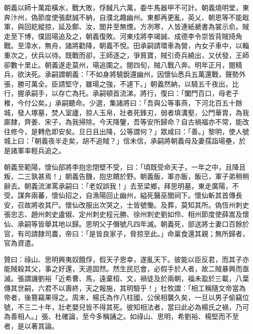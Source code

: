 \begin{pinyinscope}
 朝義以師十萬距橫水，戰大敗，俘馘凡六萬，委牛馬器甲不可計。朝義燒明堂，東奔汴州，偽節度使張獻誠不納，自濮北趣幽州。東都再更亂，英乂、朝恩等不能戢軍，與回紇縱掠，延及鄭、汝，閭井至無煙。方冽寒，人皆連紙褫書為裳示俞。賊走至下博，僕固瑒追及之，朝義復敗。河東戍將李竭誠、成德李令崇皆背賊掎角戰。至漳水，無舟，諸將勸降，朝義不悅。田承嗣請環車為營，內女子車中，以輜重次之，伏兵以待。既戰而卻，王師逐之，爭貲寶，賊引奇兵繞出，又伏發，王師卻數十里止。朝義遂走莫州，瑒追圍之。閱四旬，賊八戰八奔。明年正月，閱精兵，欲決死。承嗣謂朝義：「不如身將驍銳還幽州，因懷仙悉兵五萬還戰，聲勢外張，勝可萬全。臣請堅守，雖瑒之強，不遽下。」朝義然納，以騎五千夜出，比行，握承嗣手，以存亡為托。承嗣頓首流涕。將行，復曰：「闔門百口，母老子稚，今付公矣。」承嗣聽命。少選，集諸將曰：「吾與公等事燕，下河北百五十餘城，發人塚墓，焚人室廬，掠人玉帛，壯者死鋒刃，弱者填溝壑，公門華胄，為我廝隸，齊姜、宋子，為我掃除。今天降鑒，吾等安所歸命？自古禍福亦不常，能改往修今，是轉危即安矣。旦日且出降，公等謂何？」眾咸曰：「善。」黎明，使人號城上曰：「朝義夜半走矣，胡不追賊？」信未信，承嗣將朝義母及妻孺詣瑒壘，於是諸軍率輕兵追之。



 朝義至範陽，懷仙部將李抱忠閉壁不受，曰：「頃既受命天子，一年之中，且降且叛，二三孰甚焉！」朝義告饑，抱忠饋於野。朝義飯，軍亦飯，飯已，軍子弟稍稍辭去。朝義流涕罵承嗣曰：「老奴誤我！」去至梁鄉，拜思明墓，東走廣陽，不受。謀奔兩蕃，懷仙招之，自漁陽回止幽州，縊死醫巫閭祠下。懷仙斬其首傳長安，召故將收其尸。懷仙改服出次哭之，士皆號慟。及葬，莫知其所。偽恆州刺史張忠志、趙州刺史盧俶、定州刺史程元勝、徐州刺史劉如伶、相州節度使薛嵩及懷仙、承嗣等皆舉其地以歸。思明父子僭號凡四年滅。朝義死，部送將士妻口百餘於官，有司請隸司農，帝曰：「是皆良家子，脅掠至此。」命稟食還其親；無所歸者，官為資遣。



 贊曰：祿山、思明興夷奴餓俘，假天子恩幸，遂亂天下。彼能以臣反君，而其子亦能賊殺其父，事之好還，天道固然。然生民厄會，必假手於人者，故二賊暴興而亟滅。張謂譏劉裕「近希曹、馬，遠棄桓、文，禍徒及於兩朝，福未盈於三載，八葉傳其世嗣，六君不以壽終，天之報施，其明驗乎！」杜牧謂：「相工稱隨文帝當為帝者，後篡竊果得之。周末，楊氏為作八柱國，公侯相襲久矣，一旦以男子偷竊位號，不三二十年，壯老嬰兒皆不得其死。彼知相法者，當曰此必為楊氏之禍，乃可為善相人。」張、杜確論，至今多稱誦之。如祿山、思明，希劉裕、楊堅而不至者，是以著其論。



\end{pinyinscope}